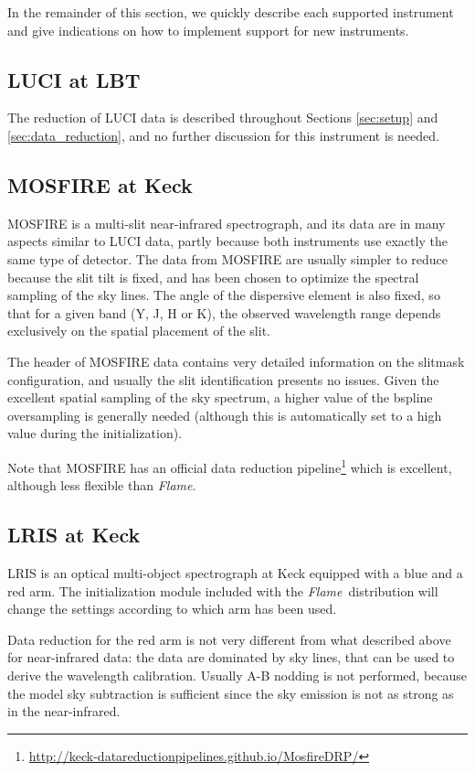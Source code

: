 \documentclass[a4paper]{article}
\newcommand{\flame}{\emph{Flame}}
\begin{document}
\begin{sloppypar}
In the remainder of this section, we quickly describe each supported instrument and give indications on how to implement support for new instruments.


\subsection{LUCI at LBT}

The reduction of LUCI data is described throughout Sections \ref{sec:setup} and \ref{sec:data_reduction}, and no further discussion for this instrument is needed.


\subsection{MOSFIRE at Keck}

MOSFIRE is a multi-slit near-infrared spectrograph, and its data are in many aspects similar to LUCI data, partly because both instruments use exactly the same type of detector. The data from MOSFIRE are usually simpler to reduce because the slit tilt is fixed, and has been chosen to optimize the spectral sampling of the sky lines. The angle of the dispersive element is also fixed, so that for a given band (Y, J, H or K), the observed wavelength range depends exclusively on the spatial placement of the slit.

The header of MOSFIRE data contains very detailed information on the slitmask configuration, and usually the slit identification presents no issues. Given the excellent spatial sampling of the sky spectrum, a higher value of the bspline oversampling is generally needed (although this is automatically set to a high value during the initialization).

Note that MOSFIRE has an official data reduction pipeline\footnote{\url{http://keck-datareductionpipelines.github.io/MosfireDRP/}} which is excellent, although less flexible than \flame.


\subsection{LRIS at Keck}

LRIS is an optical multi-object spectrograph at Keck equipped with a blue and a red arm. The initialization module included with the \flame\ distribution will change the settings according to which arm has been used.

Data reduction for the red arm is not very different from what described above for near-infrared data: the data are dominated by sky lines, that can be used to derive the wavelength calibration. Usually A-B nodding is not performed, because the model sky subtraction is sufficient since the sky emission is not as strong as in the near-infrared.


\end{sloppypar}
\end{document}
